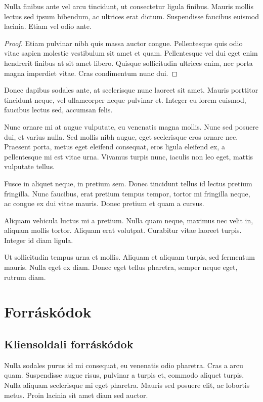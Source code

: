 \begin{theorem}
Nulla finibus ante vel arcu tincidunt, ut consectetur ligula finibus. Mauris mollis lectus sed ipsum bibendum, ac ultrices erat dictum. Suspendisse faucibus euismod lacinia. Etiam vel odio ante.
\end{theorem}
\begin{proof}
Etiam pulvinar nibh quis massa auctor congue. Pellentesque quis odio vitae sapien molestie vestibulum sit amet et quam. Pellentesque vel dui eget enim hendrerit finibus at sit amet libero. Quisque sollicitudin ultrices enim, nec porta magna imperdiet vitae. Cras condimentum nunc dui.
\end{proof}

Donec dapibus sodales ante, at scelerisque nunc laoreet sit amet. Mauris porttitor tincidunt neque, vel ullamcorper neque pulvinar et. Integer eu lorem euismod, faucibus lectus sed, accumsan felis. 

\begin{remark}
Nunc ornare mi at augue vulputate, eu venenatis magna mollis. Nunc sed posuere dui, et varius nulla. Sed mollis nibh augue, eget scelerisque eros ornare nec. Praesent porta, metus eget eleifend consequat, eros ligula eleifend ex, a pellentesque mi est vitae urna. Vivamus turpis nunc, iaculis non leo eget, mattis vulputate tellus.
\end{remark}

Fusce in aliquet neque, in pretium sem. Donec tincidunt tellus id lectus pretium fringilla. Nunc faucibus, erat pretium tempus tempor, tortor mi fringilla neque, ac congue ex dui vitae mauris. Donec pretium et quam a cursus.

\begin{note}
Aliquam vehicula luctus mi a pretium. Nulla quam neque, maximus nec velit in, aliquam mollis tortor. Aliquam erat volutpat. Curabitur vitae laoreet turpis. Integer id diam ligula.
\end{note}

Ut sollicitudin tempus urna et mollis. Aliquam et aliquam turpis, sed fermentum mauris. Nulla eget ex diam. Donec eget tellus pharetra, semper neque eget, rutrum diam.


\section{Forráskódok} %

\subsection{Kliensoldali forráskódok}
Nulla sodales purus id mi consequat, eu venenatis odio pharetra. Cras a arcu quam. Suspendisse augue risus, pulvinar a turpis et, commodo aliquet turpis. Nulla aliquam scelerisque mi eget pharetra. Mauris sed posuere elit, ac lobortis metus. Proin lacinia sit amet diam sed auctor.

